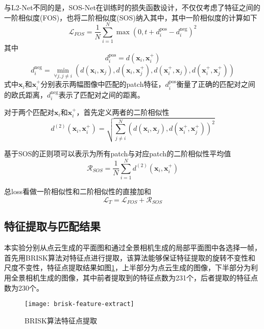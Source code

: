 与L2-Net不同的是，SOS-Net在训练时的损失函数设计，不仅仅考虑了特征之间的一阶相似度(FOS)，也将二阶相似度(SOS)纳入其中，其中一阶相似度的计算如下
\begin{equation}
	\mathcal{L}_{FOS}=\frac{1}{N}\sum_{i=1}^N \max\left(0, t+d_i^{\text{pos}}-d_i^{\text{neg}}\right)^2
\end{equation}
其中
\begin{equation}
	d_i^{\text{pos}} = d\left(\boldsymbol{x}_i, \boldsymbol{x}_i^+\right)
\end{equation}
\begin{equation}
	d_i^{\text{neg}} = \min_{\forall j, j\neq i}\left(d(\boldsymbol{x}_i, \boldsymbol{x}_j), d(\boldsymbol{x}_i, \boldsymbol{x}_j^+), d(\boldsymbol{x}_i^+, \boldsymbol{x}_j),
	d(\boldsymbol{x}_i^+, \boldsymbol{x}_j^+)\right)
\end{equation}
式中$\boldsymbol{x}_i$和$\boldsymbol{x}_i^+$分别表示两幅图像中匹配的patch特征，$d_i^{\text{pos}}$衡量了正确的匹配对之间的欧氏距离，$d_i^{\text{neg}}$表示了匹配对之间的距离。

对于两个匹配对$\boldsymbol{x}_i$和$\boldsymbol{x}_i^+$，首先定义两者的二阶相似性
\begin{equation}
	d^{(2)}(\boldsymbol{x}_i, \boldsymbol{x}_i^+) = \sqrt{\sum_{j\neq i}^{N}\left(d(\boldsymbol{x}_i, \boldsymbol{x}_j), d(\boldsymbol{x}_i^+, \boldsymbol{x}_j^+)\right)^2}
\end{equation}

基于SOS的正则项可以表示为所有patch与对应patch的二阶相似性平均值
\begin{equation}
	\mathcal{R}_{SOS}=\frac{1}{N}\sum_{i=1}^{N}d^{(2)}\left(\boldsymbol{x}_i,\boldsymbol{x}_i^+\right)
\end{equation}

总loss看做一阶相似性和二阶相似性的直接加和
\begin{equation}
	\mathcal{L}_T=\mathcal{L}_{FOS}+\mathcal{R}_{SOS}
\end{equation}

\subsection{特征提取与匹配结果}
本实验分别从点云生成的平面图和通过全景相机生成的局部平面图中各选择一帧，首先用BRISK算法\cite{leutenegger2011brisk}对特征点进行提取，该算法能够保证特征提取的旋转不变性和尺度不变性，特征点提取结果如图\ref{brisk-feature-extract}，上半部分为点云生成的图像，下半部分为利用全景相机生成的图像，其中前者提取到的特征点数为231个，后者提取的特征点数为230个。
\begin{figure}
	\centering
	\texttt{[image: brisk-feature-extract]}
	\caption{BRISK算法特征点提取}
	\label{brisk-feature-extract}
\end{figure}

